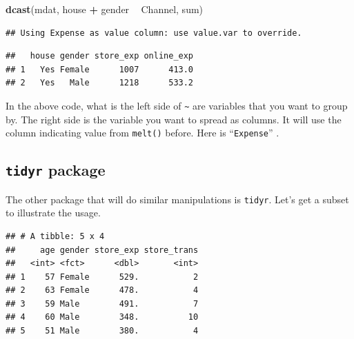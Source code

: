 \documentclass[12pt,]{krantz}
\makeatletter
\newenvironment{Shaded}{\begin{snugshade}}{\end{snugshade}}
\newcommand{\CommentTok}[1]{\textcolor[rgb]{0.37,0.37,0.37}{\textit{#1}}}
\newcommand{\DecValTok}[1]{\textcolor[rgb]{0.06,0.06,0.06}{#1}}
\newcommand{\KeywordTok}[1]{\textcolor[rgb]{0.27,0.27,0.27}{\textbf{#1}}}
\newcommand{\NormalTok}[1]{#1}
\newcommand{\OperatorTok}[1]{\textcolor[rgb]{0.43,0.43,0.43}{\textbf{#1}}}
\newcommand{\StringTok}[1]{\textcolor[rgb]{0.5,0.5,0.5}{#1}}
\newenvironment{kframe}{%
\medskip{}
\setlength{\fboxsep}{.8em}
 \def\at@end@of@kframe{}%
 \ifinner\ifhmode%
  \def\at@end@of@kframe{\end{minipage}}%
  \begin{minipage}{\columnwidth}%
 \fi\fi%
 \def\FrameCommand##1{\hskip\@totalleftmargin \hskip-\fboxsep
 \colorbox{shadecolor}{##1}\hskip-\fboxsep
     \hskip-\linewidth \hskip-\@totalleftmargin \hskip\columnwidth}%
 \MakeFramed {\advance\hsize-\width
   \@totalleftmargin\z@ \linewidth\hsize
   \@setminipage}}%
 {\par\unskip\endMakeFramed%
 \at@end@of@kframe}
\renewenvironment{Shaded}{\begin{kframe}}{\end{kframe}}
\makeatother
\begin{document}
\begin{Shaded}
\begin{Highlighting}[]
\KeywordTok{dcast}\NormalTok{(mdat, house }\OperatorTok{+}\StringTok{ }\NormalTok{gender }\OperatorTok{~}\StringTok{ }\NormalTok{Channel, sum)}
\end{Highlighting}
\end{Shaded}

\begin{verbatim}
## Using Expense as value column: use value.var to override.
\end{verbatim}

\begin{verbatim}
##   house gender store_exp online_exp
## 1   Yes Female      1007      413.0
## 2   Yes   Male      1218      533.2
\end{verbatim}

In the above code, what is the left side of \texttt{\textasciitilde{}} are variables that you want to group by. The right side is the variable you want to spread as columns. It will use the column indicating value from \texttt{melt()} before. Here is ``\texttt{Expense}'' .

\hypertarget{tidyr-package}{%
\subsection{\texorpdfstring{\texttt{tidyr} package}{tidyr package}}\label{tidyr-package}}

The other package that will do similar manipulations is \texttt{tidyr}. Let's get a subset to illustrate the usage.

\begin{Shaded}
\end{Shaded}

\begin{verbatim}
## # A tibble: 5 x 4
##     age gender store_exp store_trans
##   <int> <fct>      <dbl>       <int>
## 1    57 Female      529.           2
## 2    63 Female      478.           4
## 3    59 Male        491.           7
## 4    60 Male        348.          10
## 5    51 Male        380.           4
\end{verbatim}
\end{document}

